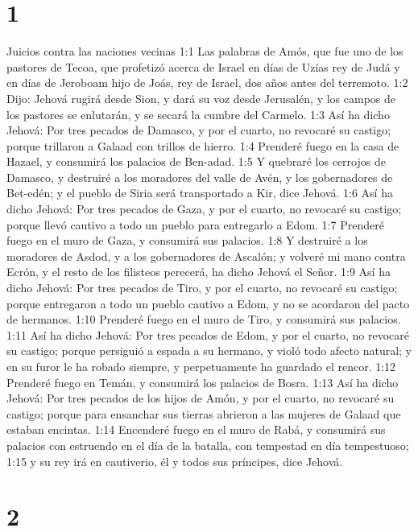 
\chapter{1}

Juicios contra las naciones vecinas  
1:1 Las palabras de Amós, que fue uno de los pastores de Tecoa, que profetizó acerca de Israel en días de Uzías rey de Judá y en días de Jeroboam hijo de Joás, rey de Israel, dos años antes del terremoto.  
1:2 Dijo: Jehová rugirá desde Sion, y dará su voz desde Jerusalén, y los campos de los pastores se enlutarán, y se secará la cumbre del Carmelo.  
1:3 Así ha dicho Jehová: Por tres pecados de Damasco, y por el cuarto, no revocaré su castigo; porque trillaron a Galaad con trillos de hierro.  
1:4 Prenderé fuego en la casa de Hazael, y consumirá los palacios de Ben-adad.  
1:5 Y quebraré los cerrojos de Damasco, y destruiré a los moradores del valle de Avén, y los gobernadores de Bet-edén; y el pueblo de Siria será transportado a Kir, dice Jehová.  
1:6 Así ha dicho Jehová: Por tres pecados de Gaza, y por el cuarto, no revocaré su castigo; porque llevó cautivo a todo un pueblo para entregarlo a Edom.  
1:7 Prenderé fuego en el muro de Gaza, y consumirá sus palacios.  
1:8 Y destruiré a los moradores de Asdod, y a los gobernadores de Ascalón; y volveré mi mano contra Ecrón, y el resto de los filisteos  perecerá, ha dicho Jehová el Señor.  
1:9 Así ha dicho Jehová: Por tres pecados de Tiro, y por el cuarto, no revocaré su castigo; porque entregaron a todo un pueblo cautivo a Edom, y no se acordaron del pacto de hermanos.  
1:10 Prenderé fuego en el muro de Tiro, y consumirá sus palacios.  
1:11 Así ha dicho Jehová: Por tres pecados de Edom, y por el cuarto, no revocaré su castigo; porque persiguió a espada a su hermano, y violó todo afecto natural; y en su furor le ha robado siempre, y perpetuamente ha guardado el rencor.  
1:12 Prenderé fuego en Temán, y consumirá los palacios de Bosra.  
1:13 Así ha dicho Jehová: Por tres pecados de los hijos de Amón, y por el cuarto, no revocaré su castigo; porque para ensanchar sus tierras abrieron a las mujeres de Galaad que estaban encintas.  
1:14 Encenderé fuego en el muro de Rabá, y consumirá sus palacios con estruendo en el día de la batalla, con tempestad en día tempestuoso;  
1:15 y su rey irá en cautiverio, él y todos sus príncipes, dice Jehová.  

\chapter{2}

